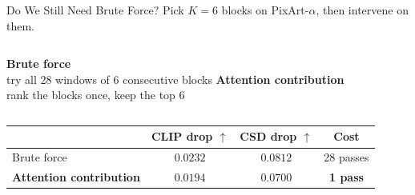 \documentclass[aspectratio=169]{beamer}
\begin{document}
\begin{frame}{Do We Still Need Brute Force?}
    \centering
    \small Pick $K=6$ blocks on PixArt-$\alpha$, then intervene on them.

    \vspace{0.5em}
    \begin{columns}[T,onlytextwidth]
        \centering\small
        \textbf{Brute force}\\ try all 28 windows of 6 consecutive blocks
        \centering\small
        \textcolor{themecolor}{\textbf{Attention contribution}}\\
        rank the blocks once, keep the top 6
    \end{columns}

    \vspace{1.0em}
    \begin{tabular}{@{}lccc@{}}
        \toprule
                                & CLIP drop $\uparrow$ & CSD drop $\uparrow$ & Cost      \\
        \midrule
        Brute force             & $0.0232$             & $0.0812$            & 28 passes \\
        \textcolor{themecolor}{\textbf{Attention contribution}}
                                & \textcolor{themecolor}{$0.0194$}
                                & \textcolor{themecolor}{$0.0700$}
                                & \textcolor{themecolor}{\textbf{1 pass}}    \\
        \bottomrule
    \end{tabular}

    \vspace{1.0em}
\end{frame}
\end{document}
